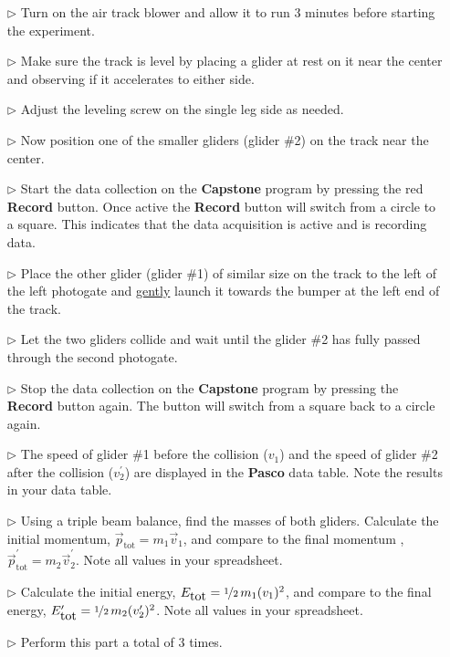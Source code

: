 \begin{itemize}
  \begin{itemize}
  \item[$\triangleright$] Turn on the air track blower and allow it to run 3 minutes before starting the experiment.
  \item[$\triangleright$] Make sure the track is level by placing a glider at rest on it near the center and observing if it accelerates to either side.
  \item[$\triangleright$] Adjust the leveling screw on the single leg side as needed.
  \item[$\triangleright$] Now position one of the smaller gliders (glider \#2) on the track near the center.  %
  \item[$\triangleright$] Start the data collection on the \textbf{Capstone} program by pressing the red \textbf{Record} button. Once active the \textbf{Record} button will switch from a circle to a square. This indicates that the data acquisition is active and is recording data.
  \item[$\triangleright$] Place the other glider (glider \#1) of similar size on the track to the left of the left photogate and \underline{gently} launch it towards the bumper at the left end of the track.
  \item[$\triangleright$] Let the two gliders collide and wait until the glider \#2 has fully passed through the second photogate.
  \item[$\triangleright$] Stop the data collection on the \textbf{Capstone} program by pressing the \textbf{Record} button again. The button will switch from a square back to a circle again.
  \item[$\triangleright$] The speed of glider \#1 before the collision ($v_1$) and the speed of glider \#2 after the collision ($v_2^\prime$) are displayed in the \textbf{Pasco} data table. Note the results in your data table.
  \item[$\triangleright$] Using a triple beam balance, find the masses of both gliders.  Calculate the initial momentum, $\vec{p}_{\mbox{tot}} = m_1 \vec{v}_1$, and compare to the final momentum , $\vec{p}_{\mbox{tot}}^\prime = m_2 \vec{v}_2^\prime$. Note all values in your spreadsheet.
  \item[$\triangleright$] Calculate the initial energy, $E_{\mbox{tot}} = \nicefrac{1}{2}\, m_1 (v_1)^2$, and compare to the final energy, $E_{\mbox{tot}}^\prime = \nicefrac{1}{2}\, m_2 (v_2^\prime)^2$. Note all values in your spreadsheet.
  \item[$\triangleright$] Perform this part a total of 3 times.
  \end{itemize}


\end{itemize}
